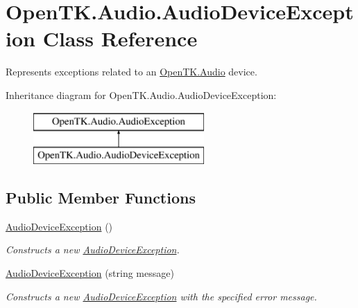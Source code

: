 \hypertarget{class_open_t_k_1_1_audio_1_1_audio_device_exception}{\section{Open\-T\-K.\-Audio.\-Audio\-Device\-Exception Class Reference}
\label{class_open_t_k_1_1_audio_1_1_audio_device_exception}
}


Represents exceptions related to an \hyperlink{namespace_open_t_k_1_1_audio}{Open\-T\-K.\-Audio} device. 


Inheritance diagram for Open\-T\-K.\-Audio.\-Audio\-Device\-Exception\-:\begin{figure}[H]
\begin{center}
\leavevmode
\includegraphics[height=2.000000cm]{class_open_t_k_1_1_audio_1_1_audio_device_exception}
\end{center}
\end{figure}
\subsection*{Public Member Functions}
\begin{DoxyCompactItemize}
\item 
\hyperlink{class_open_t_k_1_1_audio_1_1_audio_device_exception_a3108f56a974a448d2a45f494779aacd3}{Audio\-Device\-Exception} ()
\begin{DoxyCompactList}\small\item\em Constructs a new \hyperlink{class_open_t_k_1_1_audio_1_1_audio_device_exception}{Audio\-Device\-Exception}.\end{DoxyCompactList}\item 
\hyperlink{class_open_t_k_1_1_audio_1_1_audio_device_exception_a0ed11f11c381525471d1f5b4e93fab74}{Audio\-Device\-Exception} (string message)
\begin{DoxyCompactList}\small\item\em Constructs a new \hyperlink{class_open_t_k_1_1_audio_1_1_audio_device_exception}{Audio\-Device\-Exception} with the specified error message.\end{DoxyCompactList}\end{DoxyCompactItemize}


